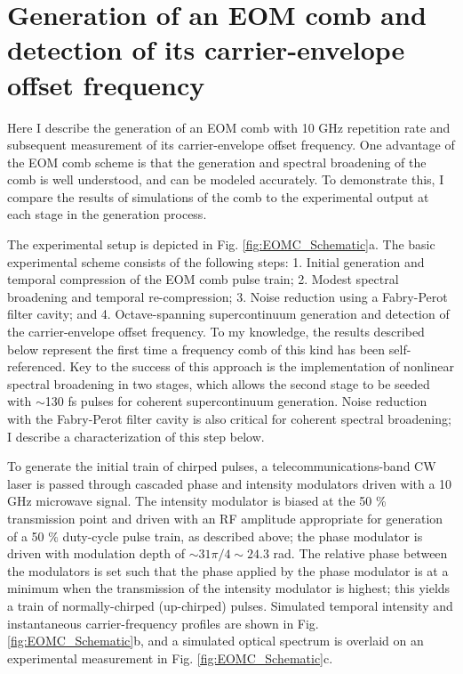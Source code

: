 \section{Generation of an EOM comb and detection of its carrier-envelope offset frequency}

Here I describe the generation of an EOM comb with 10 GHz repetition rate and subsequent measurement of its carrier-envelope offset frequency. One advantage of the EOM comb scheme is that the generation and spectral broadening of the comb is well understood, and can be modeled accurately. To demonstrate this, I compare the results of simulations of the comb to the experimental output at each stage in the generation process.

The experimental setup is depicted in Fig. \ref{fig:EOMC_Schematic}a. The basic experimental scheme consists of the following steps: 1. Initial generation and temporal compression of the EOM comb pulse train; 2. Modest spectral broadening and temporal re-compression; 3. Noise reduction using a Fabry-Perot filter cavity; and 4. Octave-spanning supercontinuum generation and detection of the carrier-envelope offset frequency. To my knowledge, the results described below represent the first time a frequency comb of this kind has been self-referenced. Key to the success of this approach is the implementation of nonlinear spectral broadening in two stages, which allows the second stage to be seeded with $\sim$130 fs pulses for coherent supercontinuum generation. Noise reduction with the Fabry-Perot filter cavity is also critical for coherent spectral broadening; I describe a characterization of this step below.

To generate the initial train of chirped pulses, a telecommunications-band CW laser is passed through cascaded phase and intensity modulators driven with a 10 GHz microwave signal. The intensity modulator is biased at the 50 \% transmission point and driven with an RF amplitude appropriate for generation of a 50 $\%$ duty-cycle pulse train, as described above;  the phase modulator is driven with modulation depth of $\sim31\pi/4\sim24.3$ rad. The relative phase between the modulators is set such that the phase applied by the phase modulator is at a minimum when the transmission of the intensity modulator is highest; this yields a train of normally-chirped (up-chirped) pulses. Simulated temporal intensity and instantaneous carrier-frequency profiles are shown in Fig. \ref{fig:EOMC_Schematic}b, and a simulated optical spectrum is overlaid on an experimental measurement in Fig. \ref{fig:EOMC_Schematic}c.



